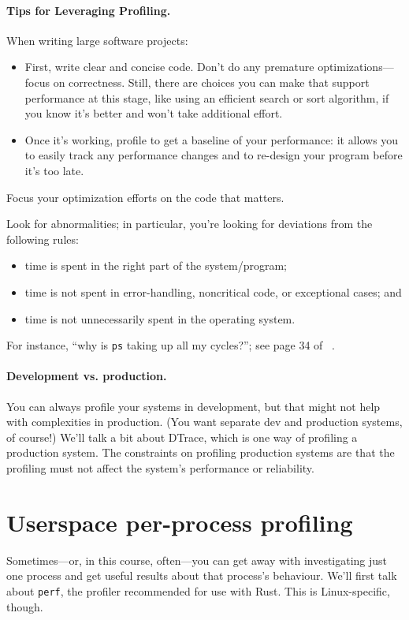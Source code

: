 \paragraph{Tips for Leveraging Profiling.}
When writing large software projects:
  \begin{itemize}
    \item First, write clear and concise code. Don't do any premature optimizations---focus on correctness. Still, there are choices you can make that support performance at this stage, like using an efficient search or sort algorithm, if you know it's better and won't take additional effort.
    \item Once it's working, profile to get a baseline of your performance: it allows you to easily track any performance changes and to re-design your program before it's too late.
  \end{itemize}
Focus your optimization efforts on the code that matters.

Look for abnormalities; in particular, you're looking for
deviations from the following rules:
\begin{itemize}
\item time is spent in the right part of the system/program;
\item time is not spent in error-handling, noncritical code, or exceptional cases; and
\item time is not unnecessarily spent in the operating system.
\end{itemize}
For instance, ``why is {\tt ps} taking up all my cycles?'';
see page 34 of ~\cite{300ps}.

\paragraph{Development vs. production.}
You can always profile your systems in development, but that might not
help with complexities in production. (You want separate dev and
production systems, of course!) We'll talk a bit about DTrace, which
is one way of profiling a production system. The constraints on profiling 
production systems are that the profiling must not affect the system's
performance or reliability.

\section*{Userspace per-process profiling}
Sometimes---or, in this course, often---you can get away with
investigating just one process and get useful results about that
process's behaviour.  We'll first talk about {\tt perf}, the profiler 
recommended for use with Rust. This is Linux-specific, though.

